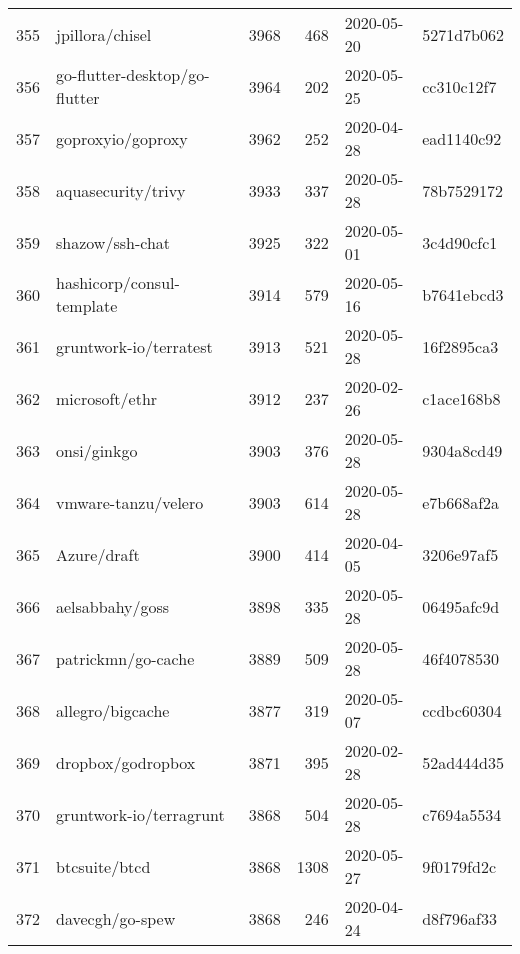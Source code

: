 \begin{longtable}{llrrll}
    355 &                                    jpillora/chisel &   3968 &    468 & 2020-05-20 &  5271d7b062 \\
    356 &                      go-flutter-desktop/go-flutter &   3964 &    202 & 2020-05-25 &  cc310c12f7 \\
    357 &                                  goproxyio/goproxy &   3962 &    252 & 2020-04-28 &  ead1140c92 \\
    358 &                                 aquasecurity/trivy &   3933 &    337 & 2020-05-28 &  78b7529172 \\
    359 &                                    shazow/ssh-chat &   3925 &    322 & 2020-05-01 &  3c4d90cfc1 \\
    360 &                          hashicorp/consul-template &   3914 &    579 & 2020-05-16 &  b7641ebcd3 \\
    361 &                             gruntwork-io/terratest &   3913 &    521 & 2020-05-28 &  16f2895ca3 \\
    362 &                                     microsoft/ethr &   3912 &    237 & 2020-02-26 &  c1ace168b8 \\
    363 &                                        onsi/ginkgo &   3903 &    376 & 2020-05-28 &  9304a8cd49 \\
    364 &                                vmware-tanzu/velero &   3903 &    614 & 2020-05-28 &  e7b668af2a \\
    365 &                                        Azure/draft &   3900 &    414 & 2020-04-05 &  3206e97af5 \\
    366 &                                    aelsabbahy/goss &   3898 &    335 & 2020-05-28 &  06495afc9d \\
    367 &                                 patrickmn/go-cache &   3889 &    509 & 2020-05-28 &  46f4078530 \\
    368 &                                   allegro/bigcache &   3877 &    319 & 2020-05-07 &  ccdbc60304 \\
    369 &                                  dropbox/godropbox &   3871 &    395 & 2020-02-28 &  52ad444d35 \\
    370 &                            gruntwork-io/terragrunt &   3868 &    504 & 2020-05-28 &  c7694a5534 \\
    371 &                                      btcsuite/btcd &   3868 &   1308 & 2020-05-27 &  9f0179fd2c \\
    372 &                                    davecgh/go-spew &   3868 &    246 & 2020-04-24 &  d8f796af33 \\

\end{longtable}

